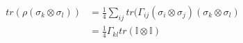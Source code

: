 \begin{equation}\label{eqn:proof_gamma}
\begin{split}
 tr( \rho (\sigma_k \otimes \sigma_l) ) &= \frac{1}{4}\sum_{ij} tr(\Gamma_{ij} (\sigma_i \otimes \sigma_j)(\sigma_k \otimes \sigma_l)\\
 &=\frac{1}{4} \Gamma_{kl} tr (\mathbb{I} \otimes \mathbb{I})
\end{split}
\end{equation}

